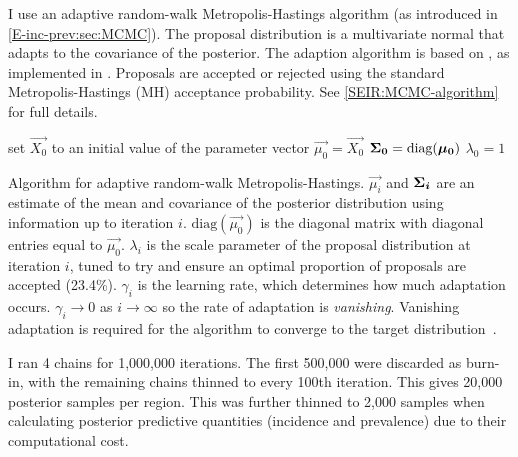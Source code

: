\documentclass[thesis.tex]{subfiles}
\begin{document}
I use an adaptive random-walk Metropolis-Hastings algorithm (as introduced in \cref{E-inc-prev:sec:MCMC}).
The proposal distribution is a multivariate normal that adapts to the covariance of the posterior.
The adaption algorithm is based on \textcite[algorithm 4]{andrieuTutorial}, as implemented in \textcite{ghoshApproximate}.
Proposals are accepted or rejected using the standard Metropolis-Hastings (MH) acceptance probability.
See \cref{SEIR:MCMC-algorithm} for full details.
\begin{algorithm}
 set $\vec{X_0}$ to an initial value of the parameter vector \;
 $\vec{\mu_0} = \vec{X_0}$ \;
 $\bm{\Sigma_0} = \text{diag}(\bm{\mu_0})$ \;
 $\lambda_0 = 1$ \;
 \caption{Algorithm for adaptive random-walk Metropolis-Hastings. $\vec{\mu_i}$ and $\bm{\Sigma_i}$ are an estimate of the mean and covariance of the posterior distribution using information up to iteration $i$. $\text{diag}(\vec{\mu_0})$ is the diagonal matrix with diagonal entries equal to $\vec{\mu_0}$. $\lambda_i$ is the scale parameter of the proposal distribution at iteration $i$, tuned to try and ensure an optimal proportion of proposals are accepted (23.4\%). $\gamma_i$ is the learning rate, which determines how much adaptation occurs. $\gamma_i \to 0$ as $i \to \infty$ so the rate of adaptation is \emph{vanishing}. Vanishing adaptation is required for the algorithm to converge to the target distribution~\autocite[section 3]{andrieuTutorial}.}
 \label{SEIR:MCMC-algorithm}
\end{algorithm}

I ran 4 chains for 1,000,000 iterations.
The first 500,000 were discarded as burn-in, with the remaining chains thinned to every 100th iteration.
This gives 20,000 posterior samples per region.
This was further thinned to 2,000 samples when calculating posterior predictive quantities (incidence and prevalence) due to their computational cost.
\end{document}
